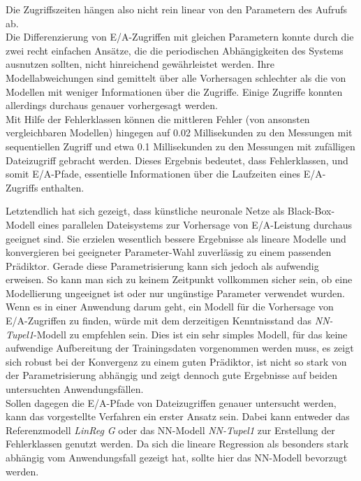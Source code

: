 \documentclass[
	12pt,
	a4paper,
	BCOR10mm,
	DIV14,
	listof=totoc,
	bibliography=totoc,
	headsepline
]{scrreprt}
\begin{document}
Die Zugriffszeiten hängen also nicht rein linear von den Parametern des Aufrufs ab. \\
Die Differenzierung von E/A-Zugriffen mit gleichen Parametern konnte durch die zwei recht einfachen Ansätze, die die periodischen Abhängigkeiten des Systems ausnutzen sollten, nicht hinreichend gewährleistet werden. Ihre Modellabweichungen sind gemittelt über alle Vorhersagen schlechter als die von Modellen mit weniger Informationen über die Zugriffe. Einige Zugriffe konnten allerdings durchaus genauer vorhergesagt werden.\\
Mit Hilfe der Fehlerklassen können die mittleren Fehler (von ansonsten vergleichbaren Modellen) hingegen auf 0.02 Millisekunden zu den Messungen mit sequentiellen Zugriff und etwa 0.1 Millisekunden zu den Messungen mit zufälligen Dateizugriff gebracht werden.
Dieses Ergebnis bedeutet, dass Fehlerklassen, und somit E/A-Pfade, essentielle Informationen über die Laufzeiten eines E/A-Zugriffs enthalten.\medskip

Letztendlich hat sich gezeigt, dass künstliche neuronale Netze als Black-Box-Modell eines parallelen Dateisystems zur Vorhersage von E/A-Leistung durchaus geeignet sind.
Sie erzielen wesentlich bessere Ergebnisse als lineare Modelle und konvergieren bei geeigneter Parameter-Wahl zuverlässig zu einem passenden Prädiktor.
Gerade diese Parametrisierung kann sich jedoch als aufwendig erweisen.
So kann man sich zu keinem Zeitpunkt vollkommen sicher sein, ob eine Modellierung ungeeignet ist oder nur ungünstige Parameter verwendet wurden.\\
Wenn es in einer Anwendung darum geht, ein Modell für die Vorhersage von E/A-Zugriffen zu finden, würde mit dem derzeitigen Kenntnisstand das \textit{NN-Tupel1}-Modell zu empfehlen sein. Dies ist ein sehr simples Modell, für das keine aufwendige Aufbereitung der Trainingsdaten vorgenommen werden muss, es zeigt sich robust bei der Konvergenz zu einem guten Prädiktor, ist nicht so stark von der Parametrisierung abhängig und zeigt dennoch gute Ergebnisse auf beiden untersuchten Anwendungsfällen.\\
Sollen dagegen die E/A-Pfade von Dateizugriffen genauer untersucht werden, kann das vorgestellte Verfahren ein erster Ansatz sein. Dabei kann entweder das Referenzmodell \textit{LinReg G} oder das NN-Modell \textit{NN-Tupel1} zur Erstellung der Fehlerklassen genutzt werden.
Da sich die lineare Regression als besonders stark abhängig vom Anwendungsfall gezeigt hat, sollte hier das NN-Modell bevorzugt werden.
\end{document}
